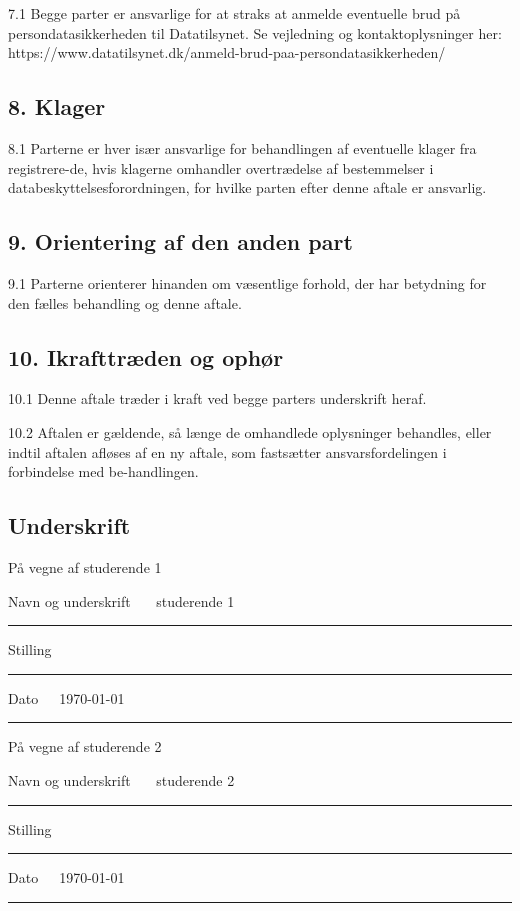 \documentclass[11pt, a4paper]{article}
\newcommand{\studerendeET}{ studerende 1 }	 			%
\newcommand{\studerendeTO}{ studerende 2 }	 			%
\begin{document}
7.1 Begge parter er ansvarlige for at straks at anmelde eventuelle brud på persondatasikkerheden til Datatilsynet. Se vejledning og kontaktoplysninger her:\\{\color{blue}https://www.datatilsynet.dk/anmeld-brud-paa-persondatasikkerheden/}

\subsection*{8. Klager}

8.1 Parterne er hver især ansvarlige for behandlingen af eventuelle klager fra registrere-de, hvis klagerne omhandler overtrædelse af bestemmelser i databeskyttelsesforordningen, for hvilke parten efter denne aftale er ansvarlig.

\subsection*{9. Orientering af den anden part}

9.1 Parterne orienterer hinanden om væsentlige forhold, der har betydning for den fælles behandling og denne aftale.

\subsection*{10. Ikrafttræden og ophør}

10.1 Denne aftale træder i kraft ved begge parters underskrift heraf.

10.2 Aftalen er gældende, så længe de omhandlede oplysninger behandles, eller indtil aftalen afløses af en ny aftale, som fastsætter ansvarsfordelingen i forbindelse med be-handlingen.




\subsection*{Underskrift}

På vegne af \studerendeET

Navn og underskrift~~~\studerendeET
\vspace{1mm}
\hrule
\vspace{5mm}
Stilling~~~
\vspace{1mm}
\hrule
\vspace{5mm}
Dato~~~\today
\vspace{1mm}
\hrule

\vspace{5mm}

På vegne af \studerendeTO

Navn og underskrift~~~\studerendeTO
\vspace{1mm}
\hrule
\vspace{5mm}
Stilling~~~
\vspace{1mm}
\hrule
\vspace{5mm}
Dato~~~\today
\vspace{1mm}
\hrule
\end{document}
